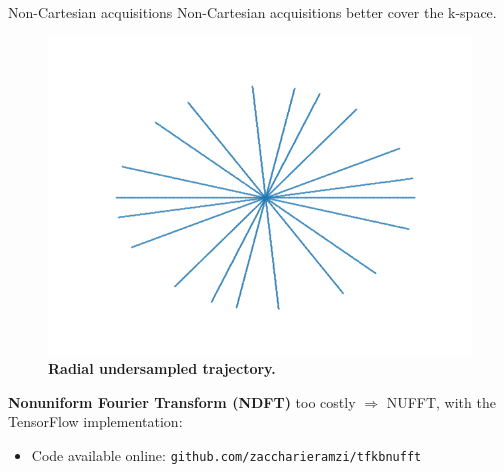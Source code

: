 \begin{frame}{Non-Cartesian acquisitions}
    Non-Cartesian acquisitions better cover the k-space.
    \pause
    \begin{figure}
        \centering
        \includegraphics[height=0.5\textheight]{Figures/dl_mri_figures/radial_trajectory.png}
        \caption{\textbf{Radial undersampled trajectory.}}
    \end{figure}
    \pause

    \textbf{Nonuniform Fourier Transform (NDFT)} too costly $\Rightarrow$ NUFFT, with the TensorFlow implementation:
    \begin{itemize}
        \item {} Code available online: \texttt{github.com/zaccharieramzi/tfkbnufft}
    \end{itemize}
\end{frame}

